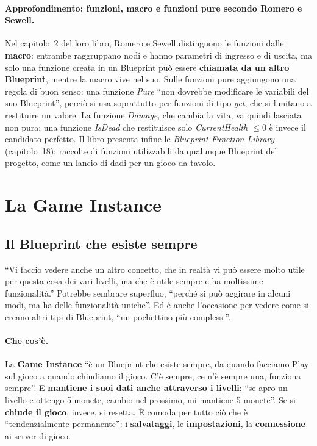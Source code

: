 \paragraph{Approfondimento: funzioni, macro e funzioni pure secondo Romero e
Sewell.} Nel capitolo~2 del loro libro, Romero e Sewell distinguono le funzioni
dalle \textbf{macro}: entrambe raggruppano nodi e hanno parametri di ingresso e
di uscita, ma solo una funzione creata in un Blueprint può essere
\textbf{chiamata da un altro Blueprint}, mentre la macro vive nel suo. Sulle
funzioni pure aggiungono una regola di buon senso: una funzione \emph{Pure}
``non dovrebbe modificare le variabili del suo Blueprint'', perciò si usa
soprattutto per funzioni di tipo \emph{get}, che si limitano a restituire un
valore. La funzione \emph{Damage}, che cambia la vita, va quindi lasciata non
pura; una funzione \emph{IsDead} che restituisce solo \emph{CurrentHealth $\leq
0$} è invece il candidato perfetto. Il libro presenta infine le \emph{Blueprint
Function Library} (capitolo~18): raccolte di funzioni utilizzabili da
qualunque Blueprint del progetto, come un lancio di dadi per un gioco da tavolo.

\section{La Game Instance}
\label{gd13:sec:game-instance}

\subsection{Il Blueprint che esiste sempre}

``Vi faccio vedere anche un altro concetto, che in realtà vi può essere molto
utile per questa cosa dei vari livelli, ma che è utile sempre e ha moltissime
funzionalità.'' Potrebbe sembrare superfluo, ``perché si può aggirare in alcuni
modi, ma ha delle funzionalità uniche''. Ed è anche l'occasione per vedere come
si creano altri tipi di Blueprint, ``un pochettino più complessi''.

\paragraph{Che cos'è.} La \textbf{Game Instance} ``è un Blueprint che esiste
sempre, da quando facciamo Play sul gioco a quando chiudiamo il gioco. C'è
sempre, ce n'è sempre una, funziona sempre''. E \textbf{mantiene i suoi dati
anche attraverso i livelli}: ``se apro un livello e ottengo 5 monete, cambio nel
prossimo, mi mantiene 5 monete''. Se si \textbf{chiude il gioco}, invece, si
resetta. È comoda per tutto ciò che è ``tendenzialmente permanente'': i
\textbf{salvataggi}, le \textbf{impostazioni}, la \textbf{connessione} ai server
di gioco.

